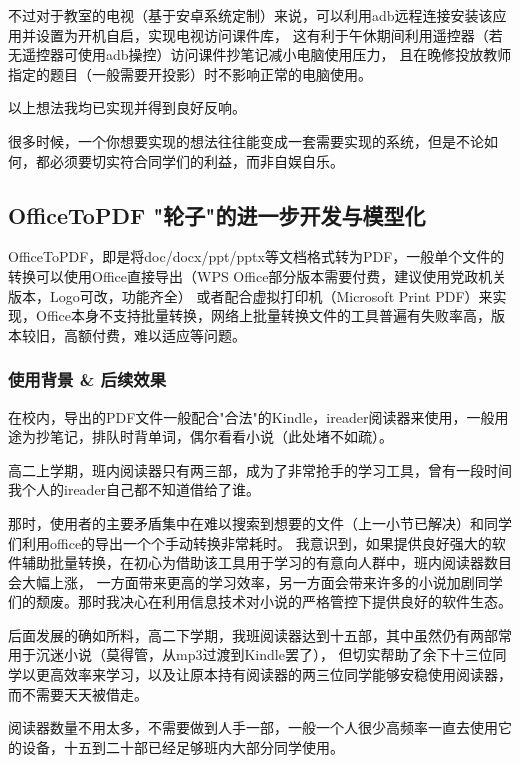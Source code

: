 \documentclass[a5paper]{article}
\begin{document}
        不过对于教室的电视（基于安卓系统定制）来说，可以利用adb远程连接安装该应用并设置为开机自启，实现电视访问课件库，
        这有利于午休期间利用遥控器（若无遥控器可使用adb操控）访问课件抄笔记减小电脑使用压力，
        且在晚修投放教师指定的题目（一般需要开投影）时不影响正常的电脑使用。

        以上想法我均已实现并得到良好反响。

        很多时候，一个你想要实现的想法往往能变成一套需要实现的系统，但是不论如何，都必须要切实符合同学们的利益，而非自娱自乐。
    \newpage

    \subsection{OfficeToPDF "轮子"的进一步开发与模型化}
        OfficeToPDF，即是将doc/docx/ppt/pptx等文档格式转为PDF，一般单个文件的转换可以使用Office直接导出（WPS Office部分版本需要付费，建议使用党政机关版本，Logo可改，功能齐全）
        或者配合虚拟打印机（Microsoft Print PDF）来实现，Office本身不支持批量转换，网络上批量转换文件的工具普遍有失败率高，版本较旧，高额付费，难以适应等问题。

        \subsubsection{使用背景 \& 后续效果}
        在校内，导出的PDF文件一般配合"合法"的Kindle，ireader阅读器来使用，一般用途为抄笔记，排队时背单词，偶尔看看小说（此处堵不如疏）。

        高二上学期，班内阅读器只有两三部，成为了非常抢手的学习工具，曾有一段时间我个人的ireader自己都不知道借给了谁。

        那时，使用者的主要矛盾集中在难以搜索到想要的文件（上一小节已解决）和同学们利用office的导出一个个手动转换非常耗时。
        我意识到，如果提供良好强大的软件辅助批量转换，在初心为借助该工具用于学习的有意向人群中，班内阅读器数目会大幅上涨，
        一方面带来更高的学习效率，另一方面会带来许多的小说加剧同学们的颓废。那时我决心在利用信息技术对小说的严格管控下提供良好的软件生态。

        后面发展的确如所料，高二下学期，我班阅读器达到十五部，其中虽然仍有两部常用于沉迷小说（莫得管，从mp3过渡到Kindle罢了），
        但切实帮助了余下十三位同学以更高效率来学习，以及让原本持有阅读器的两三位同学能够安稳使用阅读器，而不需要天天被借走。
        
        阅读器数量不用太多，不需要做到人手一部，一般一个人很少高频率一直去使用它的设备，十五到二十部已经足够班内大部分同学使用。
\end{document}
